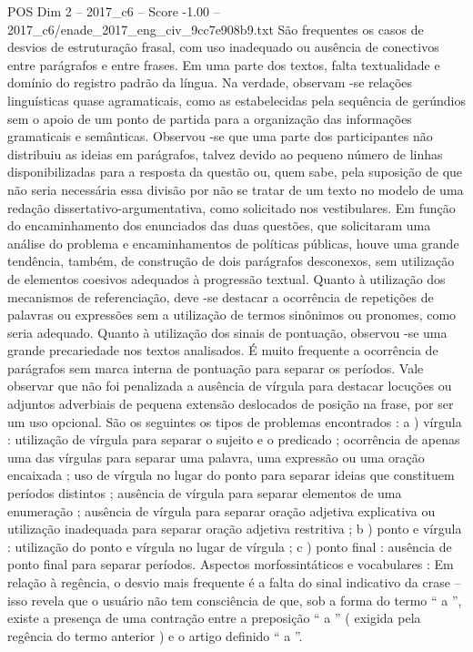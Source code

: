\begin{textsample}{POS Dim 2 – 2017\_c6 – Score -1.00 – 2017\_c6/enade\_2017\_eng\_civ\_9cc7e908b9.txt}
São frequentes os casos de desvios de estruturação frasal, com uso inadequado ou ausência de conectivos entre parágrafos e entre frases.
Em uma parte dos textos, falta textualidade e domínio do registro padrão da língua.
Na verdade, observam -se relações linguísticas quase agramaticais, como as estabelecidas pela sequência de gerúndios sem o apoio de um ponto de partida para a organização das informações gramaticais e semânticas.
Observou -se que uma parte dos participantes não distribuiu as ideias em parágrafos, talvez devido ao pequeno número de linhas disponibilizadas para a resposta da questão ou, quem sabe, pela suposição de que não seria necessária essa divisão por não se tratar de um texto no modelo de uma redação dissertativo-argumentativa, como solicitado nos vestibulares.
Em função do encaminhamento dos enunciados das duas questões, que solicitaram uma análise do problema e encaminhamentos de políticas públicas, houve uma grande tendência, também, de construção de dois parágrafos desconexos, sem utilização de elementos coesivos adequados à progressão textual.
Quanto à utilização dos mecanismos de referenciação, deve -se destacar a ocorrência de repetições de palavras ou expressões sem a utilização de termos sinônimos ou pronomes, como seria adequado.
Quanto à utilização dos sinais de pontuação, observou -se uma grande precariedade nos textos analisados.
É muito frequente a ocorrência de parágrafos sem marca interna de pontuação para separar os períodos.
Vale observar que não foi penalizada a ausência de vírgula para destacar locuções ou adjuntos adverbiais de pequena extensão deslocados de posição na frase, por ser um uso opcional.
São os seguintes os tipos de problemas encontrados : a ) vírgula : utilização de vírgula para separar o sujeito e o predicado ; ocorrência de apenas uma das vírgulas para separar uma palavra, uma expressão ou uma oração encaixada ; uso de vírgula no lugar do ponto para separar ideias que constituem períodos distintos ; ausência de vírgula para separar elementos de uma enumeração ; ausência de vírgula para separar oração adjetiva explicativa ou utilização inadequada para separar oração adjetiva restritiva ; b ) ponto e vírgula : utilização do ponto e vírgula no lugar de vírgula ; c ) ponto final : ausência de ponto final para separar períodos.
Aspectos morfossintáticos e vocabulares : Em relação à regência, o desvio mais frequente é a falta do sinal indicativo da crase – isso revela que o usuário não tem consciência de que, sob a forma do termo “ a ”, existe a presença de uma contração entre a preposição “ a ” ( exigida pela regência do termo anterior ) e o artigo definido “ a ”.

\end{textsample}

